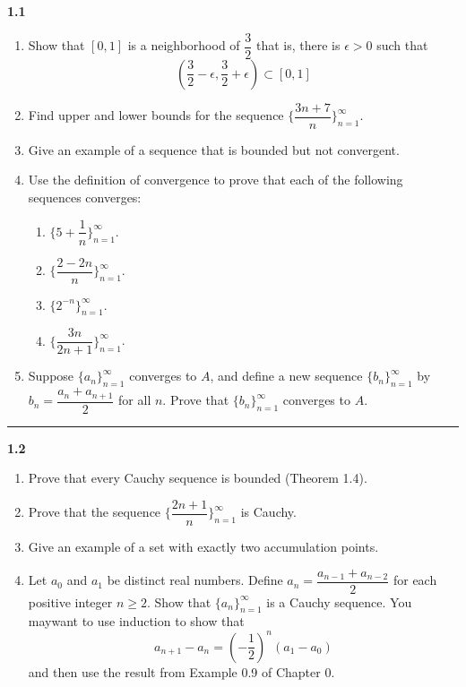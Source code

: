 \documentclass[fleqn]{article}
\begin{document}
  \textbf{1.1}
  \begin{enumerate}
    \item Show that $[0, 1]$ is a neighborhood of $\dfrac{3}{2}$ that is, there is $\epsilon > 0$ such that
    $$
      \left(\dfrac{3}{2}-\epsilon, \dfrac{3}{2}+\epsilon\right) \subset [0,1]
    $$

    \item Find upper and lower bounds for the sequence $\{ \dfrac{3n+7}{n}\}_{n=1}^{\infty}$.

    \item Give an example of a sequence that is bounded but not convergent.

    \item Use the definition of convergence to prove that each of the following sequences converges:
    \begin{enumerate}
      \item $\{5+\dfrac{1}{n}\}_{n=1}^{\infty}$.
      
      \item $\{\dfrac{2-2n}{n}\}_{n=1}^{\infty}$.

      \item $\{2^{-n}\}_{n=1}^{\infty}$.

      \item $\{\dfrac{3n}{2n+1}\}_{n=1}^{\infty}$.
    \end{enumerate}

    \item Suppose $\{a_n\}_{n=1}^{\infty}$ converges to $A$, and define a new sequence $\{b_n\}_{n=1}^{\infty}$ by
    $b_n=\dfrac{a_n+a_{n+1}}{2}$ for all $n$. Prove that $\{b_n\}_{n=1}^{\infty}$ converges to $A$.
  \end{enumerate}

  \rule{15cm}{2pt}

  \textbf{1.2}
  \begin{enumerate}
    \item Prove that every Cauchy sequence is bounded (Theorem 1.4).

    \item Prove that the sequence $\{\dfrac{2n+1}{n}\}_{n=1}^{\infty}$ is Cauchy.

    \item Give an example of a set with exactly two accumulation points.

    \item Let $a_0$ and $a_1$ be distinct real numbers. Define $a_n=\dfrac{a_{n-1}+a_{n-2}}{2}$ for each positive integer
    $n \geqslant 2$. Show that $\{a_n\}_{n=1}^{\infty}$ is a Cauchy sequence. You maywant to use induction to show that
    $$
      a_{n+1}-a_n=\left(-\dfrac{1}{2}\right)^n \left(a_1-a_0\right)
    $$
    and then use the result from Example 0.9 of Chapter 0.
  \end{enumerate}
\end{document}
